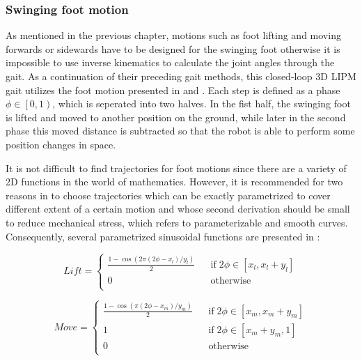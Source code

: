\subsubsection{Swinging foot motion}
As mentioned in the previous chapter, motions such as foot lifting and moving forwards or sidewards have to be designed for the swinging foot otherwise it is impossible to use inverse kinematics to calculate the joint angles through the gait. As a continuation of their preceding gait methods, this closed-loop 3D LIPM gait utilizes the foot motion presented in \cite{graf2009robust} and \cite{BHumanCodeRelease2009}.
Each step is defined as a phase $ \phi\in\left[0,1\right) $, which is seperated into two halves. In the fist half, the swinging foot is lifted and moved to another position on the ground, while later in the second phase this moved distance is subtracted so that the robot is able to perform some position changes in space.

It is not difficult to find trajectories for foot motions since there are a variety of 2D functions in the world of mathematics. However, it is recommended for two reasons in \cite{BHumanCodeRelease2009} to choose trajectories which can be exactly parametrized to cover different extent of a certain motion and whose second derivation should be small to reduce mechanical stress, which refers to parameterizable and smooth curves. Consequently, several parametrized sinusoidal functions are presented in \cite{graf2009robust}:

\begin{equation}
\label{liftequation}
\mathit{Lift} = \left\{\begin{array}{lcl}
\frac{1-\cos(2\pi(2\phi-x_l)/y_l)}{2} &      &\text{if}\; 2\phi\in\left[x_l,x_l+y_l\right]\\
0     &      & \text{otherwise}\\
\end{array}\right.
\end{equation}

\begin{equation}
\label{moveequation}
\mathit{Move} = \left\{\begin{array}{lcl}
\frac{1-\cos(\pi(2\phi-x_m)/y_m)}{2} &      &\text{if}\; 2\phi\in\left[x_m,x_m+y_m\right]\\
1     &      & \text{if}\; 2\phi\in\left[x_m+y_m,1\right]\\
0	& & \text{otherwise}\\
\end{array}\right.	
\end{equation}

